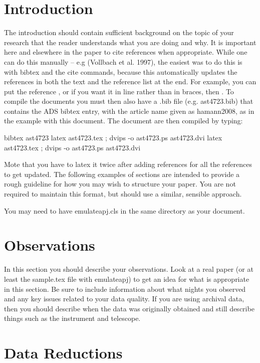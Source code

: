 \documentclass{emulateapj}
\begin{document}
\section{Introduction}

The introduction should contain sufficient
background on the topic of your research that the reader understands what
you are doing and why. It is important here and elsewhere in the paper to
cite references when appropriate. While one can do this manually -- e.g
(Vollbach et al. 1997), the easiest was to do this is with bibtex and the
cite commands, because this automatically updates the references in both
the text and the reference list at the end. For example, you can put the
reference \cite{hamann2008}, or if you want it in line rather than in
braces, then \citet{hamann2008}. To compile the documents you must then
also have a .bib file (e.g. ast4723.bib) that contains the ADS bibtex entry, with
the article name given as hamann2008, as in the example with this document.
The document are then compiled by typing:

bibtex ast4723
latex ast4723.tex ; dvips -o ast4723.ps ast4723.dvi
latex ast4723.tex ; dvips -o ast4723.ps ast4723.dvi

Mote that you have to latex it twice after adding references for all the references
to get updated.
The following examples of sections are intended to provide a rough guideline for how
you may wish to structure your paper. You are not required to maintain this format,
but should use a similar, sensible approach.

You may need to have emulateapj.cls in the same directory as your document.


\section{Observations}

In this section you should describe your observations. Look at a real paper (or
at least the sample.tex file with emulateapj) to get an idea for what is appropriate
in this section. Be sure to include information about what nights you observed
and any key issues related to your data quality.  If you are using archival data,
then you should describe when the data was originally obtained and still describe 
things such as the instrument and telescope.

\section{Data Reductions}
\end{document}
